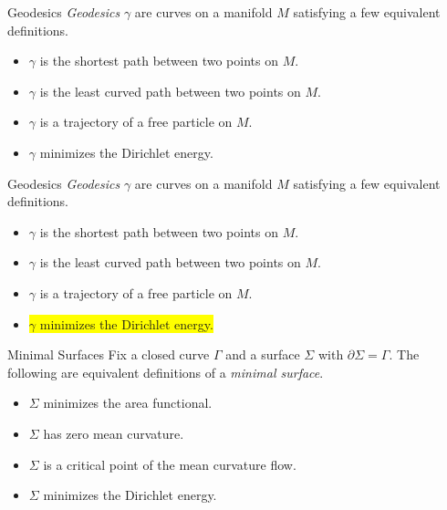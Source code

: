 \documentclass[usenames,dvipsnames]{beamer}
\theoremstyle{definition}
\theoremstyle{theorem}
\begin{document}
        \begin{frame}{Geodesics}
            \emph{Geodesics} $\gamma$ are curves on a manifold $M$ satisfying a few equivalent definitions.
            \begin{itemize}
                \item $\gamma$ is the shortest path between two points on $M$.
                \item $\gamma$ is the least curved path between two points on $M$.
                \item $\gamma$ is a trajectory of a free particle on $M$.
                \item $\gamma$ minimizes the Dirichlet energy.
            \end{itemize}
        \end{frame}
        
            \begin{frame}{Geodesics}
            \emph{Geodesics} $\gamma$ are curves on a manifold $M$ satisfying a few equivalent definitions.
            \begin{itemize}
                \item $\gamma$ is the shortest path between two points on $M$.
                \item $\gamma$ is the least curved path between two points on $M$.
                \item $\gamma$ is a trajectory of a free particle on $M$.
                \item \colorbox<1>{yellow}{$\gamma$ minimizes the Dirichlet energy.}
            \end{itemize}
        \end{frame}
        
        \begin{frame}{Minimal Surfaces}
             Fix a closed curve $\Gamma$ and a surface $\Sigma$ with $\partial \Sigma = \Gamma$. The following are equivalent definitions of a \emph{minimal surface}.
            \begin{itemize}
                \item $\Sigma$ minimizes the area functional.
                \item $\Sigma$ has zero mean curvature.
                \item $\Sigma$ is a critical point of the mean curvature flow.
                \item $\Sigma$ minimizes the Dirichlet energy.
            \end{itemize}
        \end{frame}
        
\end{document}
